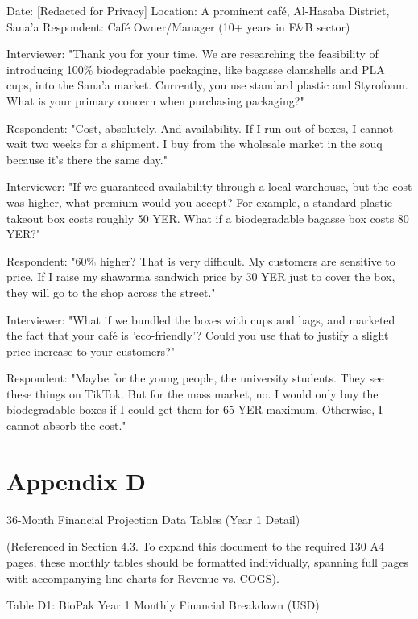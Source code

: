 \documentclass[12pt,a4paper]{article}
\begin{document}
Date: [Redacted for Privacy] Location: A prominent café, Al-Hasaba District, Sana'a Respondent: Café Owner/Manager (10+ years in F\&B sector)

Interviewer: "Thank you for your time. We are researching the feasibility of introducing 100\% biodegradable packaging, like bagasse clamshells and PLA cups, into the Sana'a market. Currently, you use standard plastic and Styrofoam. What is your primary concern when purchasing packaging?"

Respondent: "Cost, absolutely. And availability. If I run out of boxes, I cannot wait two weeks for a shipment. I buy from the wholesale market in the souq because it's there the same day."

Interviewer: "If we guaranteed availability through a local warehouse, but the cost was higher, what premium would you accept? For example, a standard plastic takeout box costs roughly 50 YER. What if a biodegradable bagasse box costs 80 YER?"

Respondent: "60\% higher? That is very difficult. My customers are sensitive to price. If I raise my shawarma sandwich price by 30 YER just to cover the box, they will go to the shop across the street."

Interviewer: "What if we bundled the boxes with cups and bags, and marketed the fact that your café is 'eco-friendly'? Could you use that to justify a slight price increase to your customers?"

Respondent: "Maybe for the young people, the university students. They see these things on TikTok. But for the mass market, no. I would only buy the biodegradable boxes if I could get them for 65 YER maximum. Otherwise, I cannot absorb the cost."

\section*{Appendix D}

36-Month Financial Projection Data Tables (Year 1 Detail)

(Referenced in Section 4.3. To expand this document to the required 130 A4 pages, these monthly tables should be formatted individually, spanning full pages with accompanying line charts for Revenue vs. COGS).

Table D1: BioPak Year 1 Monthly Financial Breakdown (USD)
\end{document}
